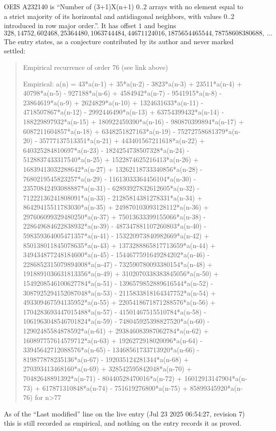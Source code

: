 \documentclass[11pt,a4paper]{article}
\theoremstyle{plain}
\theoremstyle{definition}
\begin{document}
OEIS A232140 is ``Number of (3+1)X(n+1) 0..2 arrays with no element equal to a strict majority of its horizontal and antidiagonal neighbors, with values 0..2 introduced in row major order.''. It has offset $1$ and begins
\[
328, 14752, 602468, 25364480, 1063744484, 44671124016, 1875654465544, 78758608380688,\ \dots
\]
The entry states, as a conjecture contributed by its author and never marked settled:
\begin{quote}
Empirical recurrence of order 76 (see link above)

Empirical: a(n) = 43*a(n-1) + 35*a(n-2) - 3823*a(n-3) + 23511*a(n-4) + 40798*a(n-5) - 927188*a(n-6) + 4584942*a(n-7) - 9541915*a(n-8) - 23864619*a(n-9) + 2624829*a(n-10) + 1324631633*a(n-11) - 4718507867*a(n-12) - 2992446490*a(n-13) + 63754399432*a(n-14) - 188229897932*a(n-15) + 180922459390*a(n-16) - 980870399894*a(n-17) + 6087211604857*a(n-18) + 6348251827163*a(n-19) - 75272758681379*a(n-20) - 35777137513351*a(n-21) + 443401567211618*a(n-22) + 640325284810697*a(n-23) - 1824254738507328*a(n-24) - 5128837433317540*a(n-25) + 1522874625216413*a(n-26) + 16839413032288642*a(n-27) + 13262118733340856*a(n-28) - 7680219545823257*a(n-29) - 11613033364456104*a(n-30) - 23570842493088887*a(n-31) - 62893927832612605*a(n-32) - 71222136241808091*a(n-33) - 21285814381278331*a(n-34) + 86429415511783030*a(n-35) + 249870103093128112*a(n-36) + 297606099329480250*a(n-37) + 75013633399155066*a(n-38) - 228649684622838932*a(n-39) - 487347881107260803*a(n-40) - 598359364005471357*a(n-41) - 153220973840982669*a(n-42) + 850138011845078635*a(n-43) + 1373288865817713659*a(n-44) + 349434877248184600*a(n-45) - 1544677591649284202*a(n-46) - 2286852315079894008*a(n-47) - 732590780093380154*a(n-48) + 1918891036631813356*a(n-49) + 3102070338383845056*a(n-50) + 1549208546100627784*a(n-51) - 1396579852889616544*a(n-52) - 3087925294152087048*a(n-53) - 2115833818164347752*a(n-54) + 493309467594135952*a(n-55) + 2205418671871288576*a(n-56) + 1704283693447015488*a(n-57) - 41501467515510784*a(n-58) - 1061963048546701824*a(n-59) - 748045925398827520*a(n-60) - 12902485584878592*a(n-61) + 293846083987062784*a(n-62) + 160897757614579712*a(n-63) + 1926272918020096*a(n-64) - 33945642712088576*a(n-65) - 13468561733713920*a(n-66) - 819877878235136*a(n-67) - 192035124281344*a(n-68) + 270393413468160*a(n-69) + 328542595842048*a(n-70) + 70482648891392*a(n-71) - 80440528470016*a(n-72) + 16012913147904*a(n-73) + 617871310848*a(n-74) - 751619276800*a(n-75) + 85899345920*a(n-76) for n>77
\end{quote}
As of the ``Last modified'' line on the live entry (Jul 23 2025 06:54:27, revision 7) this is still
recorded as empirical, and nothing on the entry records it as proved.
\end{document}
